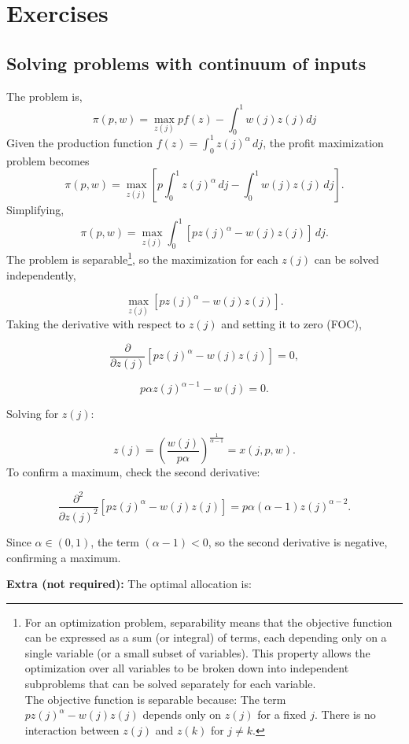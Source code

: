 \documentclass{article}
\begin{document}
\section*{Exercises}

\subsection*{Solving problems with continuum of inputs}
The problem is,
\[\pi(p,w) = \max_{z(j)} pf(z) - \int_{0}^1 w(j)z(j)dj\]
Given the production function \( f(z) = \int_0^1 z(j)^\alpha \, dj \), the profit maximization problem becomes
\[
\pi(p, w) = \max_{z(j)} \left[ p \int_0^1 z(j)^\alpha \, dj - \int_0^1 w(j) z(j) \, dj \right].
\]
Simplifying,
\[
\pi(p, w) = \max_{z(j)} \int_0^1 \left[ p z(j)^\alpha - w(j) z(j) \right] \, dj.
\]
The problem is separable\footnote{For an optimization problem, separability means that the objective function can be expressed as a sum (or integral) of terms, each depending only on a single variable (or a small subset of variables). This property allows the optimization over all variables to be broken down into independent subproblems that can be solved separately for each variable.\\
The objective function is separable because: The term \( p z(j)^\alpha - w(j) z(j) \) depends only on \( z(j) \) for a fixed \( j \). There is no interaction between \( z(j) \) and \( z(k) \) for \( j \neq k \).
}, so the maximization for each \( z(j) \) can be solved independently,

\[
\max_{z(j)} \left[ p z(j)^\alpha - w(j) z(j) \right].
\]
Taking the derivative with respect to \( z(j) \) and setting it to zero (FOC),

\[
\frac{\partial}{\partial z(j)} \left[ p z(j)^\alpha - w(j) z(j) \right] = 0,
\]

\[
p \alpha z(j)^{\alpha - 1} - w(j) = 0.
\]

Solving for \( z(j) \):

\[
z(j) = \left( \frac{w(j)}{p \alpha} \right)^{\frac{1}{\alpha - 1}} = x(j,p,w).
\]
To confirm a maximum, check the second derivative:

\[
\frac{\partial^2}{\partial z(j)^2} \left[ p z(j)^\alpha - w(j) z(j) \right] = p \alpha (\alpha - 1) z(j)^{\alpha - 2}.
\]

Since \( \alpha \in (0, 1) \), the term \( (\alpha - 1) < 0 \), so the second derivative is negative, confirming a maximum.\\
\bigskip

\textbf{Extra (not required):} The optimal allocation is:
\end{document}
